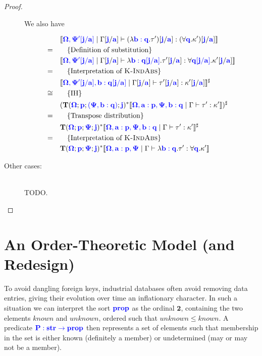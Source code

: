 \documentclass[sigplan,10pt,review,anonymous]{acmart}
\newcommand{\blum}[1]{\mathbf{\color{blue}{#1}}}
\newcommand{\sem}[1]{\llbracket #1 \rrbracket}
\newcommand{\mbf}[1]{\mathbf{#1}}
\begin{document}
\begin{proof}
\begin{description}
We also have

\begin{align*}
 &\quad \sem{\blum{\Omega, \Psi'[j/a]} \mid \Gamma[\blum{j}/\blum{a}] \vdash (\lambda \blum{b : q}. \tau')[\blum{j}/\blum{a}] : (\forall \blum{q}. \kappa')[\blum{j}/\blum{a}]}\\
=&\qquad \{ \text{Definition of substitution} \}\\
 &\quad \sem{\blum{\Omega, \Psi'[j/a]} \mid \Gamma[\blum{j}/\blum{a}] \vdash \lambda \blum{b : q[j/a]}. \tau'[\blum{j}/\blum{a}] : \forall \blum{q[j/a]}. \kappa'[\blum{j}/\blum{a}]}\\
=&\qquad \{ \text{Interpretation of \begin{sc}K-IndAbs\end{sc}} \} \\
 &\quad \sem{\blum{\Omega,\Psi'[j/a], b : q[j/a]} \mid \Gamma[\blum{j}/\blum{a}] \vdash \tau'[\blum{j}/\blum{a}] : \kappa'[\blum{j} / \blum{a}] }^\sharp\\
\cong&\qquad \{ \text{IH} \}\\
 &\quad (\mbf{T}(\blum{\Omega}; \blum{p} ; \blum{(\Psi, b:q)} ; \blum{j})^* \sem{\blum{\Omega, a : p, \Psi, b : q} \mid \Gamma \vdash \tau' : \kappa'})^\sharp\\
=&\qquad \{ \text{Transpose distribution} \} \\
 &\quad \mbf{T}(\blum{\Omega} ; \blum{p} ; \blum{\Psi} ; \blum{j})^*\sem{\blum{\Omega, a : p, \Psi, b : q} \mid \Gamma \vdash \tau' : \kappa'}^\sharp\\
=& \qquad \{ \text{Interpretation of \begin{sc}K-IndAbs\end{sc}} \}\\
 &\quad \mbf{T}(\blum{\Omega} ; \blum{p} ; \blum{\Psi} ; \blum{j})^*\sem{\blum{\Omega, a : p, \Psi} \mid \Gamma \vdash \lambda \blum{b : q}. \tau' : \forall \blum{q}. \kappa'}
\end{align*}

\item[Other cases:]~\\
TODO.
\end{description}

\end{proof}

\section{An Order-Theoretic Model (and Redesign)}

To avoid dangling foreign keys, industrial databases often avoid removing data entries, giving their evolution over time an inflationary character. In such a situation we can interpret the sort $\blum{prop}$ as the ordinal $\mbf{2}$, containing the two elements $\mathit{known}$ and $\mathit{unknown}$, ordered such that $\mathit{unknown} \leq \mathit{known}$. A predicate $\blum{P : str \to prop}$ then represents a set of elements such that membership in the set is either known (definitely a member) or undetermined (may or may not be a member).
\end{document}
